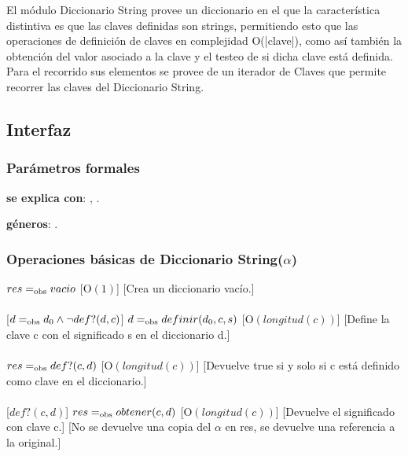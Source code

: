 El m\'odulo Diccionario String provee un diccionario en el que la caracter\'istica distintiva es que las claves definidas son strings, permitiendo esto que las operaciones de definici\'on de claves en complejidad O(|clave|), como as\'i tambi\'en la obtenci\'on del valor asociado a la clave y el testeo de si dicha clave est\'a definida.
Para el recorrido sus elementos se provee de un iterador de Claves que permite recorrer las claves del Diccionario String.

\subsection{Interfaz}

  \subsubsection{Par\'ametros formales}

  \textbf{se explica con}: , .

  \textbf{g\'eneros}: . %

  \subsubsection{Operaciones b\'asicas de Diccionario String($\alpha$)}
  {$res =_{\mathrm{obs}} vacio$}%
  [O$(1)$]
  [Crea un diccionario vac\'io.]\\\\
  [$d =_{\mathrm{obs}} d_0 \wedge \neg def?(d,c)$]
  {$d =_{\mathrm{obs}} definir(d_0,c,s)$}%
  [O$(longitud(c))$]
  [Define la clave c con el significado s en el diccionario d.]\\\\
  {$res =_{\mathrm{obs}} def?(c,d)$}%
  [O$(longitud(c))$]
  [Devuelve true si y solo si c est\'a definido como clave en el diccionario.]\\\\
  [$def?(c,d)$]
  {$res =_{\mathrm{obs}} obtener(c,d)$}%
  [O$(longitud(c))$]
  [Devuelve el significado con clave c.]
  [No se devuelve una copia del $\alpha$ en res, se devuelve una referencia a la original.]\\\\


